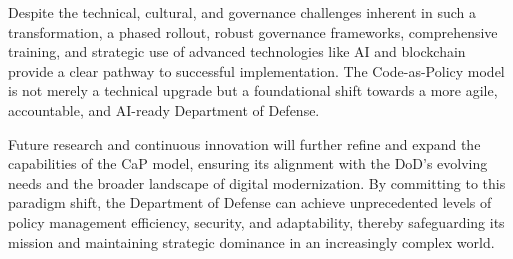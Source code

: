 \documentclass[11pt]{article}
\begin{document}
	Despite the technical, cultural, and governance challenges inherent in such a transformation, a phased rollout, robust governance frameworks, comprehensive training, and strategic use of advanced technologies like AI and blockchain provide a clear pathway to successful implementation. The Code-as-Policy model is not merely a technical upgrade but a foundational shift towards a more agile, accountable, and AI-ready Department of Defense.

	Future research and continuous innovation will further refine and expand the capabilities of the CaP model, ensuring its alignment with the DoD's evolving needs and the broader landscape of digital modernization. By committing to this paradigm shift, the Department of Defense can achieve unprecedented levels of policy management efficiency, security, and adaptability, thereby safeguarding its mission and maintaining strategic dominance in an increasingly complex world.

\end{document}
